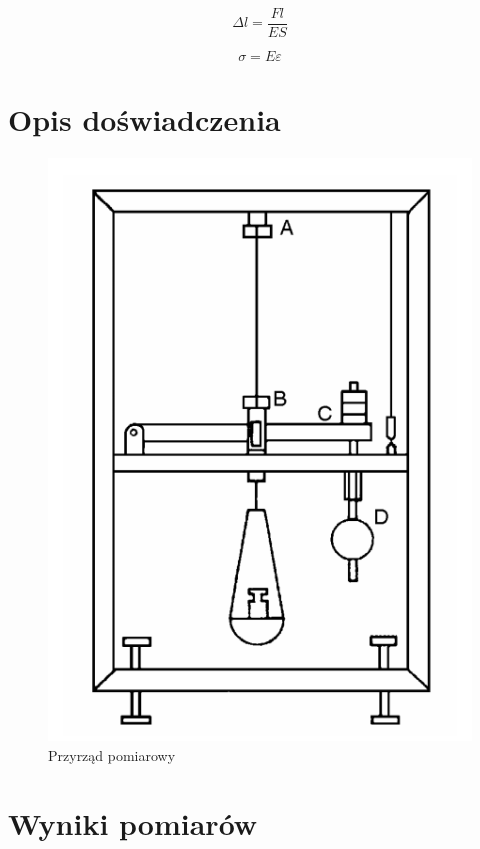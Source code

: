 \documentclass[a4paper,10pt,twoside]{article}
\begin{document}
$$ \Delta l = \frac{Fl}{ES} $$

$$ \sigma = E \varepsilon $$

\section{Opis doświadczenia}

\begin{figure}[!htp]
\centerline{\includegraphics[scale=0.35]{przyrzad.png}}
\caption{Przyrząd pomiarowy}
\label{fig:tl}
\end{figure}

\section{Wyniki pomiarów}
\end{document}
